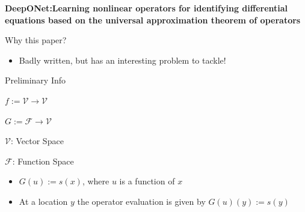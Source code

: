 \documentclass[aspectratio=169]{beamer}
\author{\authorlabel}
\newcommand{\mysubtitle}{\color{Pink}\Large{\textbf{DeepONet:Learning nonlinear operators for identifying differential equations based on the universal approximation theorem of operators}}}
\begin{document}



\begin{frame}
  \centering
  \mysubtitle\cite{lu2021a}
\end{frame}

\begin{frame}{Why this paper?}
  \centering
  \begin{itemize}
    \item Badly written, but has an interesting problem to tackle!
  \end{itemize}
\end{frame}


\begin{frame}{Preliminary Info}
  \begin{minipage}{0.5\textwidth}
    \color{Pink}{Function}\color{Black}
    \centering

    $f:=\mathcal{V}\to\mathcal{V}$
  \end{minipage}%
  \begin{minipage}{0.5\textwidth}
    \color{Pink}{Operator}\color{Black}
    \centering

    $G:=\mathcal{F}\to\mathcal{V}$
  \end{minipage}

  \centering

  $\mathcal{V}$: Vector Space

  $\mathcal{F}$: Function Space

  \begin{itemize}
    \item $G(u):=s(x)$, where $u$ is a function of $x$ 
    \item At a location $y$ the operator evaluation is given by $G(u)(y):=s(y)$
  \end{itemize}
\end{frame}
\end{document}
